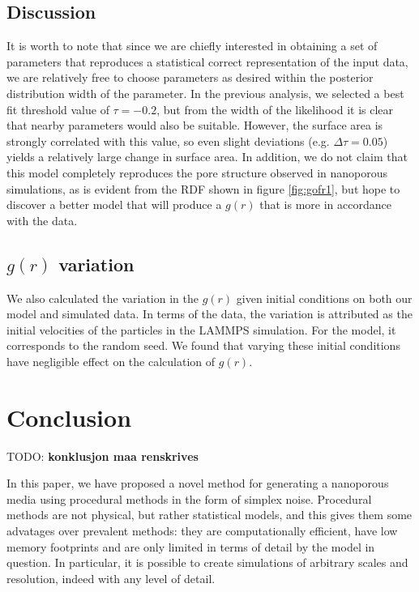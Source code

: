 \documentclass[aps,pre,twocolumn,letterpaper,floatfix,showpacs]{revtex4}
\newcommand{\todo}[1]{ {\color{Magenta} TODO: \color{Blue} \textbf{#1} }}
\begin{document}
\subsection{Discussion}
It is worth to note that since we are chiefly interested in obtaining a set of
parameters that reproduces a statistical correct representation of the input data,
we are relatively free to choose parameters as desired within the posterior distribution width of the parameter.
In the previous analysis, we selected a best fit threshold value of $\tau=-0.2$,
but from the width of the likelihood it is clear that nearby parameters would also be suitable. 
However, the surface area is strongly correlated with this value, so even slight
deviations (e.g. $\Delta \tau = 0.05$) yields a relatively large change in surface area. 
In addition, we do not claim that this model completely reproduces the pore structure
observed in nanoporous simulations, as is evident from the RDF shown in figure \ref{fig:gofr1},
but hope to discover a better model that will produce a $g(r)$ that is more in accordance with the data.

\subsection{$g(r)$ variation}
We also calculated the variation in the $g(r)$ given initial conditions on both our model and simulated data. 
In terms of the data, the variation is attributed as the initial velocities of the particles in the LAMMPS simulation. 
For the model, it corresponds to the random seed. We found that varying these
initial conditions have negligible effect on the calculation of $g(r)$.



\section{Conclusion}
\todo{konklusjon maa renskrives}

In this paper, we have proposed a novel method for generating a nanoporous media
using procedural methods in the form of simplex noise.
Procedural methods are not physical, but rather statistical models, and this gives
them some advatages over prevalent methods: they are computationally efficient, have low memory footprints and are only limited in terms of detail by the model in question. 
In particular, it is possible to create simulations of arbitrary scales and resolution, indeed with any level of detail. 
\end{document}

